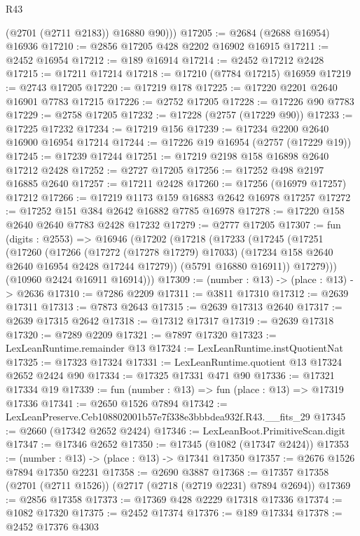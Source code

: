 \begin{lexlean}{R43}
\begin{coremodule}
          (@2701 (@2711 @2183))
          @16880
          @90)))
@17205 := @2684 (@2688 @16954) @16936
@17210 := @2856 @17205 @428 @2202 @16902 @16915
@17211 := @2452 @16954
@17212 := @189 @16914
@17214 := @2452 @17212 @2428
@17215 := @17211 @17214
@17218 := @17210 (@7784 @17215) @16959
@17219 := @2743 @17205
@17220 := @17219 @178
@17225 := @17220 @2201 @2640 @16901 @7783 @17215
@17226 := @2752 @17205
@17228 := @17226 @90 @7783
@17229 := @2758 @17205
@17232 := @17228 (@2757 (@17229 @90))
@17233 := @17225 @17232
@17234 := @17219 @156
@17239 := @17234 @2200 @2640 @16900 @16954 @17214
@17244 := @17226 @19 @16954 (@2757 (@17229 @19))
@17245 := @17239 @17244
@17251 := @17219 @2198 @158 @16898 @2640 @17212 @2428
@17252 := @2727 @17205
@17256 := @17252 @498 @2197 @16885 @2640
@17257 := @17211 @2428
@17260 := @17256 (@16979 @17257) @17212
@17266 := @17219 @1173 @159 @16883 @2642 @16978 @17257
@17272 := @17252 @151 @384 @2642 @16882 @7785 @16978
@17278 := @17220 @158 @2640 @2640 @7783 @2428 @17232
@17279 := @2777 @17205
@17307 := fun (digits : @2553) =>
  @16946
    (@17202
      (@17218
        (@17233
          (@17245
            (@17251
              (@17260
                (@17266
                  (@17272 (@17278 @17279) @17033)
                  (@17234 @158 @2640 @2640 @16954 @2428 @17244 @17279))
                (@5791 @16880 @16911))
              @17279)))
        (@10960 @2424 @16911 @16914)))
@17309 := (number : @13) -> (place : @13) -> @2636
@17310 := @7286 @2209
@17311 := @3811 @17310
@17312 := @2639 @17311
@17313 := @7873 @2643
@17315 := @2639 @17313 @2640
@17317 := @2639 @17315 @2642
@17318 := @17312 @17317
@17319 := @2639 @17318
@17320 := @7289 @2209
@17321 := @7897 @17320
@17323 := LexLeanRuntime.remainder @13
@17324 := LexLeanRuntime.instQuotientNat
@17325 := @17323 @17324
@17331 := LexLeanRuntime.quotient @13 @17324 @2652 @2424 @90
@17334 := @17325 @17331 @471 @90
@17336 := @17321 @17334 @19
@17339 := fun (number : @13) => fun (place : @13) => @17319 @17336
@17341 := @2650 @1526 @7894
@17342 := LexLeanPreserve.Ceb108802001b57e7f338e3bbbdea932f.R43.__fits_29
@17345 := @2660 (@17342 @2652 @2424)
@17346 := LexLeanBoot.PrimitiveScan.digit
@17347 := @17346 @2652
@17350 := @17345 (@1082 (@17347 @2424))
@17353 := (number : @13) -> (place : @13) -> @17341 @17350
@17357 := @2676 @1526 @7894 @17350 @2231
@17358 := @2690 @3887
@17368 := @17357 @17358 (@2701 (@2711 @1526)) (@2717 (@2718 (@2719 @2231) @7894 @2694))
@17369 := @2856 @17358
@17373 := @17369 @428 @2229 @17318 @17336
@17374 := @1082 @17320
@17375 := @2452 @17374
@17376 := @189 @17334
@17378 := @2452 @17376 @4303

\end{coremodule}
\end{lexlean}
